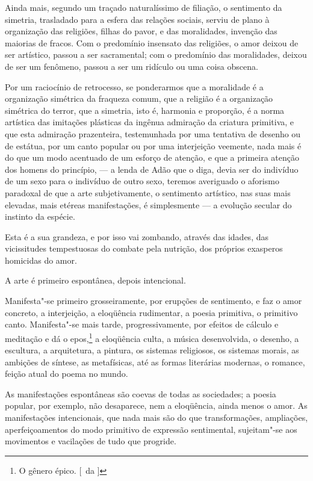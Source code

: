 Ainda mais, segundo um traçado naturalíssimo de filiação, o sentimento da
simetria, trasladado para a esfera das relações sociais, serviu de
plano à organização das religiões, filhas do pavor, e das moralidades,
invenção das maiorias de fracos. Com o predomínio insensato das
religiões, o amor deixou de ser artístico, passou a ser sacramental;
com o predomínio das moralidades, deixou de ser um fenômeno, passou a
ser um ridículo ou uma coisa obscena. 

Por um raciocínio de retrocesso,
se ponderarmos que a moralidade é a organização simétrica da fraqueza
comum, que a religião é a organização simétrica do terror, que a
simetria, isto é, harmonia e proporção, é a norma artística das
imitações plásticas da ingênua admiração da criatura primitiva, e que
esta admiração prazenteira, testemunhada por uma tentativa de desenho
ou de estátua, por um canto popular ou por uma interjeição veemente,
nada mais é do que um modo acentuado de um esforço de atenção, e que a
primeira atenção dos homens do princípio, --- a lenda de Adão que o
diga, devia ser do indivíduo de um sexo para o indivíduo de outro sexo,
teremos averiguado o aforismo paradoxal de que a arte subjetivamente, o
sentimento artístico, nas suas mais elevadas, mais etéreas
manifestações, é simplesmente --- a evolução secular do instinto da
espécie. 

Esta é a sua grandeza, e por isso vai zombando, através das
idades, das vicissitudes tempestuosas do combate pela nutrição, dos
próprios exasperos homicidas do amor. 

A arte é primeiro espontânea, depois intencional. 

Manifesta"-se primeiro grosseiramente, por
erupções de sentimento, e faz o amor concreto, a interjeição, a
eloqüência rudimentar, a poesia primitiva, o primitivo canto.
Manifesta"-se mais tarde, progressivamente, por efeitos de cálculo e
meditação e dá o epos,\footnote{ O gênero épico. [~da ]} a eloqüência 
culta, a música desenvolvida, o
desenho, a escultura, a arquitetura, a pintura, os sistemas religiosos,
os sistemas morais, as ambições de síntese, as metafísicas, até as
formas literárias modernas, o romance, feição atual do poema no mundo.

As manifestações espontâneas são coevas de todas as sociedades; a poesia
popular, por exemplo, não desaparece, nem a eloqüência, ainda menos o
amor. As manifestações intencionais, que nada mais são do que
transformações, ampliações, aperfeiçoamentos do modo primitivo de
expressão sentimental, sujeitam"-se aos movimentos e vacilações de
tudo que progride. 

